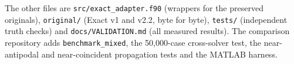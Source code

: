 \documentclass[11pt]{article}
\newcommand{\code}[1]{\texttt{#1}}
\begin{document}
The other files are \code{src/exact\_adapter.f90} (wrappers for the preserved originals), \code{original/} (Exact v1 and v2.2, byte for byte), \code{tests/} (independent truth checks) and \code{docs/VALIDATION.md} (all measured results). The comparison repository adds \code{benchmark\_mixed}, the 50,000-case cross-solver test, the near-antipodal and near-coincident propagation tests and the MATLAB harness.
\end{document}
